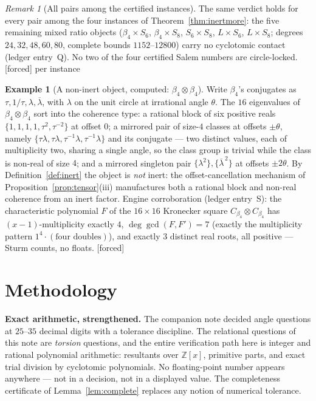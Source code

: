 \documentclass[11pt]{article}
\theoremstyle{plain}
\theoremstyle{definition}
\newtheorem{example}[theorem]{Example}
\theoremstyle{remark}
\newtheorem{remark}[theorem]{Remark}
\newcommand{\Z}{\mathbb{Z}}
\newcommand{\F}{\textnormal{[forced]}}
\begin{document}
\begin{remark}[All pairs among the certified instances]\label{rem:allpairs}
The same verdict holds for every pair among the four instances of
Theorem~\ref{thm:inertmore}: the five remaining mixed ratio objects
($\beta_4\times S_6$, $\beta_4\times S_8$, $S_6\times S_8$, $L\times S_6$,
$L\times S_8$; degrees $24,32,48,60,80$, complete bounds $1152$--$12800$)
carry no cyclotomic contact (ledger entry~Q). No two of the four certified
Salem numbers are circle-locked. \F{} per instance
\end{remark}

\begin{example}[A non-inert object, computed: $\beta_4\otimes\beta_4$]
\label{ex:tensorsq}
Write $\beta_4$'s conjugates as $\tau,1/\tau,\lambda,\overline\lambda$, with
$\lambda$ on the unit circle at irrational angle $\theta$. The $16$
eigenvalues of $\beta_4\otimes\beta_4$ sort into the coherence type: a
rational block of six positive reals $\{1,1,1,1,\tau^2,\tau^{-2}\}$ at
offset $0$; a mirrored pair of size-$4$ classes at offsets $\pm\theta$,
namely $\{\tau\lambda,\tau\lambda,\tau^{-1}\lambda,\tau^{-1}\lambda\}$ and
its conjugate --- two distinct values, each of multiplicity two, sharing a
single angle, so the class group is trivial while the class is non-real of
size $4$; and a mirrored singleton pair
$\{\lambda^2\},\{\overline\lambda^{\,2}\}$ at offsets $\pm2\theta$. By
Definition~\ref{def:inert} the object is \emph{not} inert: the
offset-cancellation mechanism of Proposition~\ref{prop:tensor}(iii)
manufactures both a rational block and non-real coherence from an inert
factor. Engine corroboration (ledger entry~S): the characteristic polynomial
$F$ of the $16\times16$ Kronecker square $C_{\beta_4}\otimes C_{\beta_4}$
has $(x-1)$-multiplicity exactly $4$, $\deg\gcd(F,F')=7$ (exactly the
multiplicity pattern $1^4\cdot(\text{four doubles})$), and exactly $3$
distinct real roots, all positive --- Sturm counts, no floats. \F
\end{example}

\section{Methodology}\label{sec:method}

\textbf{Exact arithmetic, strengthened.} The companion note decided angle
questions at $25$--$35$ decimal digits with a tolerance discipline. The
relational questions of this note are \emph{torsion} questions, and the entire
verification path here is integer and rational polynomial arithmetic: resultants
over $\Z[x]$, primitive parts, and exact trial division by cyclotomic
polynomials. No floating-point number appears anywhere --- not in a decision,
not in a displayed value. The completeness certificate of
Lemma~\ref{lem:complete} replaces any notion of numerical tolerance.
\end{document}

